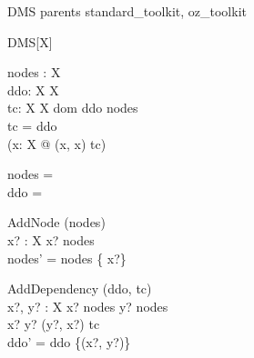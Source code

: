 \zsection DMS parents standard\_toolkit, oz\_toolkit\\

\begin{class}{DMS}[X]

\begin{state}
  nodes : \finset X\\
  ddo: X \rel X\\
  tc:  X \rel X  
\where
  dom ddo \subseteq nodes \\ 
  tc = ddo \star \\
  \lnot (\exists x:  X @ (x, x) \in tc)
\end{state}

\begin{init}
  nodes = \emptyset \\
  ddo = \emptyset
\end{init}

\begin{schema}{AddNode}
  \Delta (nodes)\\
  x? : X
\where
  x? \notin nodes\\ 
  nodes' = nodes \cup \{ x?\} 
\end{schema}

\begin{schema}{AddDependency}
  \Delta (ddo, tc)\\
  x?, y? : X
\where
  x? \notin nodes \land y? \notin nodes\\
  x? \neq y? \land (y?, x?) \notin tc \\ 
  ddo' = ddo \cup \{(x?, y?)\}
\end{schema}

\end{class} 

